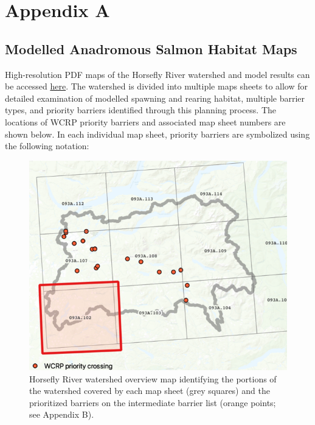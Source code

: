 \documentclass[
  letterpaper,
  DIV=11,
  numbers=noendperiod]{scrreprt}
\begin{document}
\cleardoublepage
{}
{}
\appendix

\hypertarget{appendix-a}{%
\chapter*{Appendix A}\label{appendix-a}}


\hypertarget{modelled-anadromous-salmon-habitat-maps}{%
\section*{Modelled Anadromous Salmon Habitat
Maps}\label{modelled-anadromous-salmon-habitat-maps}}


High-resolution PDF maps of the Horsefly River watershed and model
results can be accessed
\href{https://github.com/smnorris/bcfishpass/tree/main/wcrp/pdfs}{here}.
The watershed is divided into multiple maps sheets to allow for detailed
examination of modelled spawning and rearing habitat, multiple barrier
types, and priority barriers identified through this planning process.
The locations of WCRP priority barriers and associated map sheet numbers
are shown below. In each individual map sheet, priority barriers are
symbolized using the following notation:

\begin{figure}

{\centering \includegraphics{images/figure8.png}

}

\caption{\label{fig-over}Horsefly River watershed overview map
identifying the portions of the watershed covered by each map sheet
(grey squares) and the prioritized barriers on the intermediate barrier
list (orange points; see Appendix B).}

\end{figure}
\end{document}
